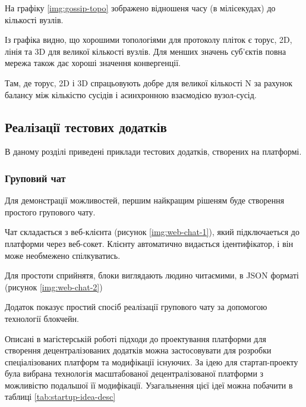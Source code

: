 \documentclass{lib/styles/default-style}
\begin{document}
    На графіку \ref{img:gossip-topo} зображено відношеня часу (в мілісекудах) до кількості вузлів.


    Із графіка видно, що хорошими топологіями для протоколу пліток є торус, 2D,
    лінія та 3D для великої кількості вузлів.
    Для менших значень суб'єктів повна мережа також дає хороші значення конвергенції.

    Там, де торус, 2D і 3D спрацьовують добре для великої кількості N
    за рахунок балансу між кількістю сусідів і асинхронною взаємодією вузол-сусід.
    
\subsection{Реалізації тестових додатків}

    В даному розділі приведені приклади тестових додатків, створених на платформі.

    \subsubsection{Груповий чат}

    Для демонстрації можливостей, першим найкращим рішеням буде створення простого групового чату.

    Чат складається з веб-клієнта (рисунок \ref{img:web-chat-1}), який підключаеться до платформи через веб-сокет.
    Клієнту автоматично видається ідентифікатор, і він може необмежено спілкуватись.


    Для простоти сприйнятя, блоки виглядають людино читаємими, в JSON форматі (рисунок \ref{img:web-chat-2})


    Додаток показує простий спосіб реалізації групового чату за допомогою технології блокчейн.


    \startStartupSection
    Описані в магістерській роботі підходи до проектування платформи для створення
    децентралізованих додатків
    можна застосовувати для розробки спеціалізованих платформ та модифікації існуючих.
    За ідею для стартап-проекту була вибрана технологія масштабованої децентралізованої
    платформи з можливістю подальшої її модифікації. Узагальнення цієї ідеї
    можна побачити в таблиці \ref{tab:startup-idea-desc}
\end{document}
